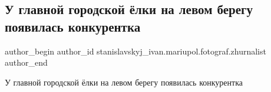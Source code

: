  
 
 
 
 

\subsection{У главной городской ёлки на левом берегу появилась конкурентка}
\label{sec:30_12_2019.fb.stanislavskyj_ivan.mariupol.fotograf.zhurnalist.1.u_glavnoi_gorodskoi_}

\ifcmt
 author_begin
   author_id stanislavskyj_ivan.mariupol.fotograf.zhurnalist
 author_end
\fi

У главной городской ёлки на левом берегу появилась конкурентка

